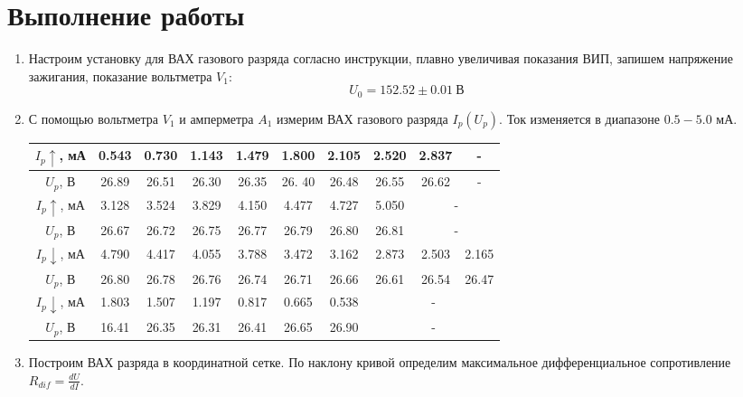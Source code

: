 \documentclass[a4paper, 12pt]{article}
\begin{document}
\section*{Выполнение работы}
\begin{enumerate}
    \item Настроим установку для ВАХ газового разряда согласно инструкции, плавно увеличивая показания ВИП, запишем напряжение
    зажигания, показание вольтметра $V_{1}$:
    \begin{equation}
        U_{0} = 152.52\pm 0.01\ \text{В}
    \end{equation}
    \item С помощью вольтметра $V_{1}$ и амперметра $A_{1}$ измерим ВАХ газового разряда $I_{p}(U_{p})$. Ток изменяется в диапазоне $0.5 - 5.0$ мА.
    \begin{table}[htbp]
        \centering
        \begin{tabular}{|c|c|c|c|c|c|c|c|c|c|}
            \hline
            $I_{p}\uparrow$, мА & 0.543 & 0.730 & 1.143 & 1.479 & 1.800 & 2.105 & 2.520 & 2.837 & -\\ \hline
            $U_{p}$, В & 26.89 & 26.51 & 26.30 & 26.35 & 26. 40 & 26.48 & 26.55 & 26.62 & -\\ \hline
            $I_{p}\uparrow$, мА & 3.128 & 3.524 & 3.829 & 4.150 & 4.477 & 4.727 & 5.050 & \multicolumn{2}{|c|}{-}\\ \hline
            $U_{p}$, В & 26.67 & 26.72 & 26.75 & 26.77 & 26.79 & 26.80 & 26.81 & \multicolumn{2}{|c|}{-}\\ \hline
            $I_{p}\downarrow$, мА & 4.790 & 4.417 & 4.055 & 3.788 & 3.472 & 3.162 & 2.873 & 2.503 & 2.165\\ \hline
            $U_{p}$, В & 26.80 & 26.78 & 26.76 & 26.74 & 26.71 & 26.66 & 26.61 & 26.54 & 26.47\\ \hline
            $I_{p}\downarrow$, мА & 1.803 & 1.507 & 1.197 & 0.817 & 0.665 & 0.538 & \multicolumn{3}{|c|}{-}\\ \hline
            $U_{p}$, В & 16.41 & 26.35 & 26.31 & 26.41 & 26.65 & 26.90 & \multicolumn{3}{|c|}{-}\\
            \hline
        \end{tabular}
    \end{table}
    \item Построим ВАХ разряда в координатной сетке. По наклону кривой определим максимальное дифференциальное сопротивление $R_{dif} = \frac{dU}{dI}$.
    \begin{figure}[htbp]
        \centering

\end{figure}
\end{enumerate}
\end{document}
